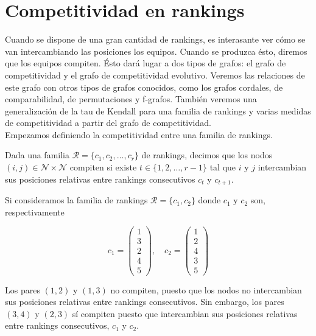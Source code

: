 \chapter{Competitividad en rankings}

Cuando se dispone de una gran cantidad de rankings, es interasante ver cómo se van intercambiando las posiciones los equipos. Cuando se produzca ésto, diremos que los equipos compiten. Ésto dará lugar a dos tipos de grafos: el grafo de competitividad y el grafo de competitividad evolutivo. Veremos las relaciones de este grafo con otros tipos de grafos conocidos, como los grafos cordales, de comparabilidad, de permutaciones y f-grafos. También veremos una generalización de la tau de Kendall para una familia de rankings y varias medidas de competitividad a partir del grafo de competitividad.\\

Empezamos definiendo la competitividad entre una familia de rankings.

\begin{defi}
Dada una familia $\mathcal{R} = \{c_1, c_2, \dots, c_r\}$ de rankings, decimos que los nodos $(i,j) \in \mathcal{N} \times \mathcal{N}$ compiten si existe $t \in \{1,2,\dots, r-1\}$ tal que $i$ y $j$ intercambian sus posiciones relativas entre rankings consecutivos $c_t$ y $c_{t+1}$.
\end{defi}

\begin{ejemplo}
Si consideramos la familia de rankings $\mathcal{R} = \{c_1, c_2\}$ donde $c_1$ y $c_2$ son, respectivamente

\begin{equation*}
c_1 = \left( \begin{array}{c}
1\\
3\\
2\\
4\\
5
\end{array} \right), \quad
c_2 = \left( \begin{array}{c}
1\\
2\\
4\\
3\\
5
\end{array} \right)
\end{equation*}

Los pares $(1,2)$ y $(1,3)$ no compiten, puesto que los nodos no intercambian sus posiciones relativas entre rankings consecutivos. Sin embargo, los pares $(3,4)$ y $(2,3)$ sí compiten puesto que intercambian sus posiciones relativas entre rankings consecutivos, $c_1$ y $c_2$.
\end{ejemplo}

